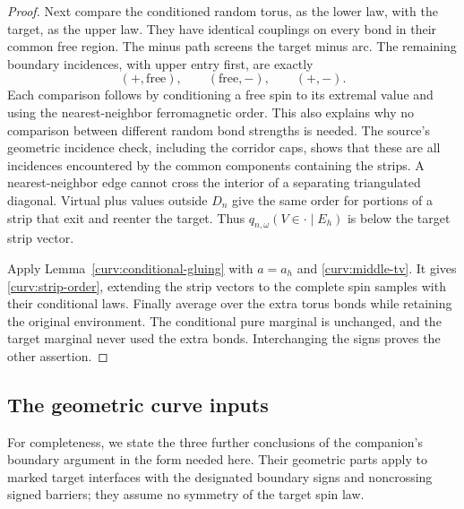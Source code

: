 \begin{proof}
Next compare the conditioned random torus, as the lower law, with the
target, as the upper law.  They have identical couplings on every bond
in their common free region.  The minus path screens the target minus
arc.  The remaining boundary incidences, with upper entry first, are
exactly
\[
 (+,\mathrm{free}),\qquad(\mathrm{free},-),\qquad(+,-).
\]
Each comparison follows by conditioning a free spin to its extremal
value and using the nearest-neighbor ferromagnetic order.  This also
explains why no comparison between different random bond strengths is
needed.  The source's geometric incidence check, including the
corridor caps, shows that these are all incidences encountered by the
common components containing the strips.  A nearest-neighbor edge
cannot cross the interior of a separating triangulated diagonal.
Virtual plus values outside $D_n$ give the same order for portions of
a strip that exit and reenter the target.  Thus
$q_{n,\omega}(V\in\cdot\mid E_h)$ is below the target strip vector.

Apply Lemma~\ref{curv:conditional-gluing} with $a=a_h$ and
\eqref{curv:middle-tv}.  It gives \eqref{curv:strip-order}, extending
the strip vectors to the complete spin samples with their conditional
laws.  Finally average over the extra torus bonds while retaining the
original environment.  The conditional pure marginal is unchanged,
and the target marginal never used the extra bonds.  Interchanging
the signs proves the other assertion.
\end{proof}

\subsection{The geometric curve inputs}

For completeness, we state the three further conclusions of the
companion's boundary argument in the form needed here.  Their geometric
parts apply to marked target interfaces with the designated boundary
signs and noncrossing signed barriers; they assume no symmetry of the
target spin law.

